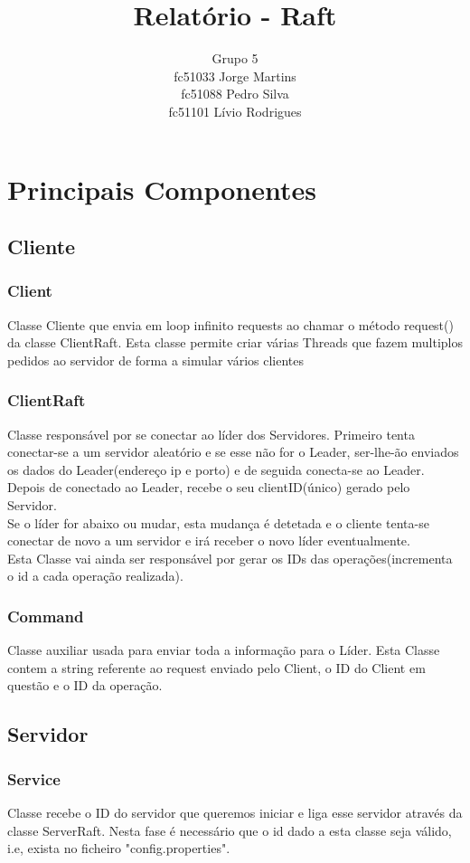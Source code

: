 \documentclass[12pt,a4paper]{report}
\author{Grupo 5 \\fc51033 Jorge Martins \\ fc51088 Pedro Silva \\ fc51101 Lívio Rodrigues}
\date{}
\begin{document}
\title{Relatório - Raft}
\maketitle
\tableofcontents
\chapter{Principais Componentes}
\section{Cliente}
\subsection{Client}
Classe Cliente que envia em loop infinito requests ao chamar o método request() da classe ClientRaft. Esta classe permite criar várias Threads que fazem multiplos pedidos ao servidor de forma a simular vários clientes

\subsection{ClientRaft}
Classe responsável por se conectar ao líder dos Servidores. Primeiro tenta conectar-se a um servidor aleatório e se esse não for o Leader, ser-lhe-ão enviados os dados do Leader(endereço ip e porto) e de seguida conecta-se ao Leader. Depois de conectado ao Leader, recebe o seu clientID(único) gerado pelo Servidor. \\
Se o líder for abaixo ou mudar, esta mudança é detetada e o cliente tenta-se conectar de novo a um servidor e irá receber o novo líder eventualmente.\\
Esta Classe vai ainda ser responsável por gerar os IDs das operações(incrementa o id a cada operação realizada).

\subsection{Command}
Classe auxiliar usada para enviar toda a informação para o Líder. Esta Classe contem a string referente ao request enviado pelo Client, o ID do Client em questão e o ID da operação.

\section{Servidor}
\subsection{Service}
Classe recebe o ID do servidor que queremos iniciar e liga esse servidor através da classe ServerRaft. Nesta fase é necessário que o id dado a esta classe seja válido, i.e, exista no ficheiro "config.properties".
\end{document}
